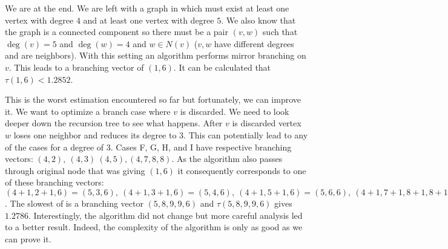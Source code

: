 We are at the end. We are left with a graph in which must exist at least one vertex with degree $4$ and at least one vertex with degree $5$. We also know that the graph is a connected component so there must be a pair $(v,w)$ such that $\deg(v)=5$ and $\deg(w)=4$ and $w \in N(v)$ ($v,w$ have different degrees and are neighbors). With this setting an algorithm performs mirror branching on $v$. This leads to a branching vector of $(1,6)$. It can be calculated that $\tau(1,6)<1.2852$.

This is the worst estimation encountered so far but fortunately, we can improve it. We want to optimize a branch case where $v$ is discarded. We need to look deeper down the recursion tree to see what happens. After $v$ is discarded vertex $w$ loses one neighbor and reduces its degree to $3$. This can potentially lead to any of the cases for a degree of $3$. Cases F, G, H, and I have respective branching vectors: $(4,2),\ (4,3)\ (4,5), (4,7,8,8)$. As the algorithm also passes through original node that was giving $(1,6)$ it consequently corresponds to one of these branching vectors: $(4+1,2+1,6)=(5,3,6),\ (4+1,3+1,6)=(5,4,6),\ (4+1,5+1,6)=(5,6,6),\ (4+1,7+1,8+1,8+1, 6)=(5,8,9,9,6)$. The slowest of is a branching vector $(5,8,9,9,6)$ and $\tau(5,8,9,9,6)$ gives $1.2786$. Interestingly, the algorithm did not change but more careful analysis led to a better result. Indeed, the complexity of the algorithm is only as good as we can prove it.


